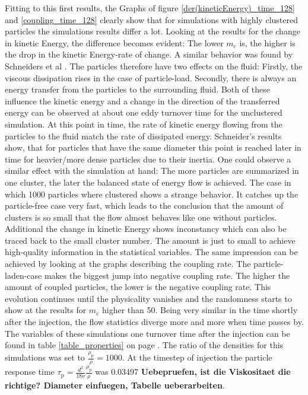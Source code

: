 \documentclass[11pt,a4paper,openany,oneside,parskip=half*]{article}
\begin{document}
Fitting to this first results, the Graphs of figure \ref{der(kineticEnergy)_time_128} and \ref{coupling_time_128} clearly show that for simulations with highly clustered particles the simulations results differ a lot. Looking at the results for the change in kinetic Energy, the difference becomes evident: The lower $ m_\mathrm{c} $ is, the higher is the drop in the kinetic Energy-rate of change. A similar behavior was found by Schneiders et al \cite{Schneiders2017}. The particles therefore have two effects on the fluid: Firstly, the viscous dissipation rises in the case of particle-load. Secondly, there is always an energy transfer from the particles to the surrounding fluid. Both of these influence the kinetic energy and a change in the direction of the transferred energy can be observed at about one eddy turnover time for the unclustered simulation. At this point in time, the rate of kinetic energy flowing from the particles to the fluid match the rate of dissipated energy. Schneider's results show, that for particles that have the same diameter this point is reached later in time for heavier/more dense particles due to their inertia. One could observe a similar effect with the simulation at hand: The more particles are summarized in one cluster, the later the balanced state of energy flow is achieved. 
\newline 
The case in which 1000 particles where clustered shows a strange behavior. It catches up the particle-free case very fast, which leads to the conclusion that the amount of clusters is so small that the flow almost behaves like one without particles. Additional the change in kinetic Energy shows inconstancy which can also be traced back to the small cluster number. The amount is just to small to achieve high-quality information in the statistical variables. 
\newline
The same impression can be achieved by looking at the graphs describing the coupling rate. The particle-laden-case makes the biggest jump into negative coupling rate. The higher the amount of coupled particles, the lower is the negative coupling rate. This evolution continues until the physicality vanishes and the randomness starts to show at the results for $m_\mathrm{c}$ higher than 50. 
\newline
Being very similar in the time shortly after the injection, the flow statistics diverge more and more when time passes by. The variables of these simulations one turnover time after the injection can be found in table \ref{table_properties} on page \pageref{table_properties}. The ratio of the densities for this simulations was set to $\frac{\rho_\mathrm{p}}{\rho} = 1000$. At the timestep of injection the particle response time $\tau_\mathrm{p}=\frac{d^2}{18 \nu} \frac{\rho_\mathrm{p}}{\rho}$ was 0.03497 \textbf{Uebepruefen, ist die Viskositaet die richtige? Diameter einfuegen, Tabelle ueberarbeiten}.
\end{document}
